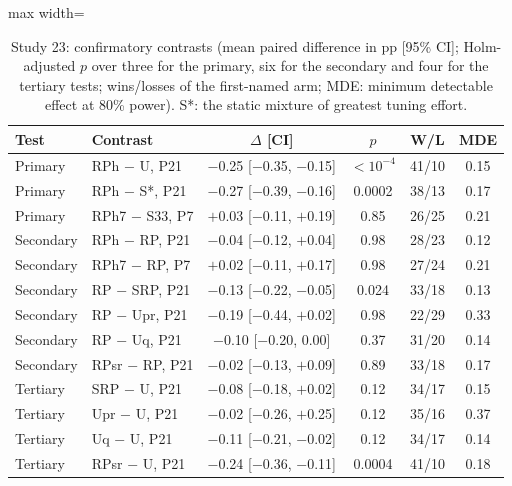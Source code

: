 \begin{table}[t]
\caption{Study 23: confirmatory contrasts (mean paired difference in pp [95\% CI]; Holm-adjusted $p$ over three for the primary, six for the secondary and four for the tertiary tests; wins/losses of the first-named arm; MDE: minimum detectable effect at 80\% power). S*: the static mixture of greatest tuning effort.}\label{tab:s23f}
\centering
\small
\begin{adjustbox}{max width=\linewidth}
\begin{tabular}{llcccc}
\toprule
Test & Contrast & $\Delta$ [CI] & $p$ & W/L & MDE \\
\midrule
Primary & RPh $-$ U, P21 & $-$0.25 [$-$0.35, $-$0.15] & \ensuremath{<10^{-4}} & 41/10 & 0.15 \\
Primary & RPh $-$ S*, P21 & $-$0.27 [$-$0.39, $-$0.16] & 0.0002 & 38/13 & 0.17 \\
Primary & RPh7 $-$ S33, P7 & $+$0.03 [$-$0.11, $+$0.19] & 0.85 & 26/25 & 0.21 \\
Secondary & RPh $-$ RP, P21 & $-$0.04 [$-$0.12, $+$0.04] & 0.98 & 28/23 & 0.12 \\
Secondary & RPh7 $-$ RP, P7 & $+$0.02 [$-$0.11, $+$0.17] & 0.98 & 27/24 & 0.21 \\
Secondary & RP $-$ SRP, P21 & $-$0.13 [$-$0.22, $-$0.05] & 0.024 & 33/18 & 0.13 \\
Secondary & RP $-$ Upr, P21 & $-$0.19 [$-$0.44, $+$0.02] & 0.98 & 22/29 & 0.33 \\
Secondary & RP $-$ Uq, P21 & $-$0.10 [$-$0.20, 0.00] & 0.37 & 31/20 & 0.14 \\
Secondary & RPsr $-$ RP, P21 & $-$0.02 [$-$0.13, $+$0.09] & 0.89 & 33/18 & 0.17 \\
Tertiary & SRP $-$ U, P21 & $-$0.08 [$-$0.18, $+$0.02] & 0.12 & 34/17 & 0.15 \\
Tertiary & Upr $-$ U, P21 & $-$0.02 [$-$0.26, $+$0.25] & 0.12 & 35/16 & 0.37 \\
Tertiary & Uq $-$ U, P21 & $-$0.11 [$-$0.21, $-$0.02] & 0.12 & 34/17 & 0.14 \\
Tertiary & RPsr $-$ U, P21 & $-$0.24 [$-$0.36, $-$0.11] & 0.0004 & 41/10 & 0.18 \\
\bottomrule
\end{tabular}
\end{adjustbox}
\end{table}
